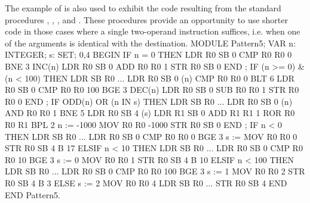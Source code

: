 The example of  is also used to exhibit the code resulting from the standard procedures , , , and . These procedures provide an opportunity to use shorter code in those cases where a single two-operand instruction suffices, i.e. when one of the arguments is identical with the destination.
\begintt
MODULE Pattern5;
  VAR n: INTEGER; s: SET;            0,4
BEGIN
  IF n = 0 THEN                      LDR R0 SB 0
                                     CMP R0 R0 0
                                     BNE 3
    INC(n)                           LDR R0 SB 0
                                     ADD R0 R0 1
                                     STR R0 SB 0
  END ;                              
  IF (n >= 0) & (n < 100) THEN       LDR SB R0 ...
                                     LDR R0 SB 0 (n)
                                     CMP R0 R0 0
                                     BLT 6
                                     LDR R0 SB 0
                                     CMP R0 R0 100
                                     BGE 3
    DEC(n)                           LDR R0 SB 0
                                     SUB R0 R0 1
                                     STR R0 R0 0
  END ;                              
  IF ODD(n) OR (n IN s) THEN         LDR SB R0 ...
                                     LDR R0 SB 0 (n)
                                     AND R0 R0 1
                                     BNE 5
                                     LDR R0 SB 4 (s)
                                     LDR R1 SB 0
                                     ADD R1 R1 1
                                     ROR R0 R0 R1
                                     BPL 2
    n := -1000                       MOV R0 R0 -1000
                                     STR R0 SB 0
  END ;                                   
  IF n < 0 THEN                      LDR SB R0 ...
                                     LDR R0 SB 0
                                     CMP R0 R0 0
                                     BGE 3
    s := {}                          MOV R0 R0 0 {}
                                     STR R0 SB 4
                                     B 17
  ELSIF n < 10 THEN                  LDR SB R0 ...
                                     LDR R0 SB 0
                                     CMP R0 R0 10
                                     BGE 3
    s := {0}                         MOV R0 R0 1
                                     STR R0 SB 4
                                     B 10
  ELSIF n < 100 THEN                 LDR SB R0 ...
                                     LDR R0 SB 0
                                     CMP R0 R0 100
                                     BGE 3
    s := {1}                         MOV R0 R0 2
                                     STR R0 SB 4
                                     B 3
  ELSE                               
    s := {2}                         MOV R0 R0 4
                                     LDR SB R0 ...
                                     STR R0 SB 4
  END
END Pattern5.
\endtt


